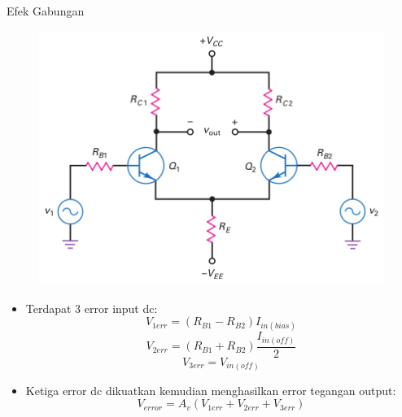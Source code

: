 \documentclass[aspectratio=169]{beamer}
\begin{document}
\begin{frame}{Efek Gabungan}
	\begin{multicols}{2}
		\begin{figure}
			\centering
			\includegraphics[height=0.6\textheight]{gambar/01.output_of_diff_amp_includes_desired_signal_and_error_voltage}
		\end{figure}
		\columnbreak
		\begin{itemize}
			\item Terdapat 3 error input dc:
			\begin{equation}
				V_{1err} = (R_{B1} - R_{B2}) I_{in(bias)}
			\end{equation}
			\begin{equation}
				V_{2err} = (R_{B1} + R_{B2}) \frac{I_{in(off)}}{2}
			\end{equation}
			\begin{equation}
				V_{3err} = V_{in(off)}
			\end{equation}
			\item Ketiga error dc dikuatkan kemudian menghasilkan error tegangan output:
			\begin{equation}
				V_{error} = A_v (V_{1err} + V_{2err} + V_{3err})
			\end{equation}
		\end{itemize}
	\end{multicols}
\end{frame}
\end{document}
